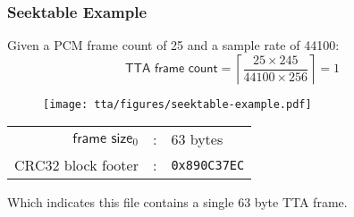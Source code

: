 \subsubsection{Seektable Example}
Given a PCM frame count of 25 and a sample rate of 44100:
\begin{equation*}
\textsf{TTA frame count} = \left\lceil\frac{25 \times 245}{44100 \times 256}\right\rceil = 1
\end{equation*}
\begin{figure}[h]
  \texttt{[image: tta/figures/seektable-example.pdf]}
\end{figure}
\begin{table}[h]
  \begin{tabular}{rcl}
    $\textsf{frame size}_0$ & : & 63 bytes \\
    \textsf{CRC32 block footer} & : & \texttt{0x890C37EC} \\
  \end{tabular}
\end{table}
\par
\noindent
Which indicates this file contains a single 63 byte TTA frame.

\clearpage

